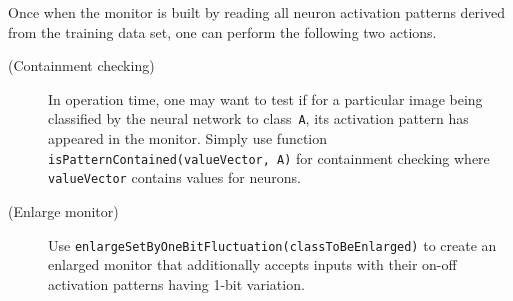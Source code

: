 \documentclass{article}
\begin{document}
Once when the monitor is built by reading all neuron activation patterns derived from the training data set, one can perform the following two actions.

\begin{description}
     \item[(Containment checking)] In operation time, one may want to test if for a particular image being classified by the neural network to class~\texttt{A}, its activation pattern has appeared in the monitor. Simply use function \texttt{isPatternContained(valueVector, A)} for containment checking where \texttt{valueVector} contains values for neurons. 
     \item[(Enlarge monitor)] Use \texttt{enlargeSetByOneBitFluctuation(classToBeEnlarged)} to create an enlarged monitor that additionally accepts inputs with their on-off activation patterns having 1-bit variation. 
\end{description}





\end{document}
